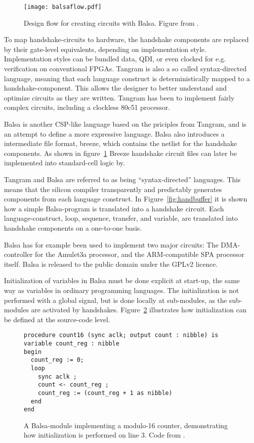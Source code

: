 \begin{figure}[htbp]
  \centering
  \texttt{[image: balsaflow.pdf]}
  \caption{Design flow for creating circuits with Balsa. Figure from
    \cite{tut}.}
  \label{fig:balsaflow}
\end{figure}


To map handshake-circuits to hardware, the handshake components are
replaced by their gate-level equivalents, depending on implementation
style. Implementation styles can be bundled data, QDI, or even clocked
for e.g. verification on conventional FPGAs. Tangram is also a so
called syntax-directed language, meaning that each language construct
is deterministically mapped to a handshake-component. This allows the
designer to better understand and optimize circuits as they are
written. Tangram has been to implement fairly complex circuits,
including a clockless 80c51 processor\cite{80c51}.

Balsa\cite{tut} is another CSP-like language based on the priciples
from Tangram, and is an attempt to define a more expressive
language. Balsa also introduces a intermediate file format, breeze,
which contains the netlist for the handshake components. As shown in
figure~\ref{fig:balsaflow} Breeze handshake circuit files can later be
implemented into standard-cell logic by.

Tangram and Balsa are referred to as being ``syntax-directed''
languages. This means that the silicon compiler transparently and
predictably generates components from each language construct. In
Figure~\ref{fig:handbuffer} it is shown how a simple Balsa-program is
translated into a handshake circuit. Each language-construct, loop,
sequence, transfer, and variable, are translated into handshake
components on a one-to-one basis.

Balsa has for example been used to implement two major circuits: The
DMA-controller for the Amulet3a processor, and the ARM-compatible SPA
processor itself. Balsa is released to the public domain under the
GPLv2 licence.

\label{par:init}
Initialization of variables in Balsa must be done explicit at
start-up, the same way as variables in ordinary programming
languages. The initialization is not performed with a global signal,
but is done locally at sub-modules, as the sub-modules are activated
by handshakes. Figure~\ref{fig:init} illustrates how initialization
can be defined at the source-code level.

\begin{figure}[htbp]
\begin{lstlisting}
procedure count16 (sync aclk; output count : nibble) is
variable count_reg : nibble
begin
  count_reg := 0;
  loop
    sync aclk ;
    count <- count_reg ;
    count_reg := (count_reg + 1 as nibble)
  end
end
\end{lstlisting}
\caption{A Balsa-module implementing a modulo-16 counter,
  demonstrating how initialization is performed on line 3. Code from
  \cite{tut}.}
\label{fig:init}
\end{figure}


